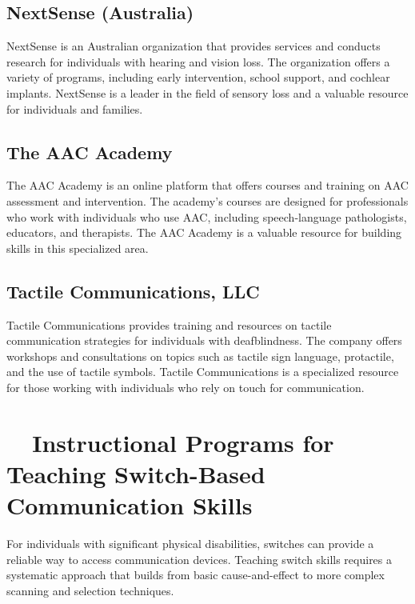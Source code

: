\subsection{NextSense (Australia)}\label{app6:nextsense}
NextSense is an Australian organization that provides services and conducts research for individuals with hearing and vision loss. The organization offers a variety of programs, including early intervention, school support, and cochlear implants. NextSense is a leader in the field of sensory loss and a valuable resource for individuals and families.

\subsection{The AAC Academy}\label{app6:aac-academy}
The AAC Academy is an online platform that offers courses and training on AAC assessment and intervention. The academy's courses are designed for professionals who work with individuals who use AAC, including speech-language pathologists, educators, and therapists. The AAC Academy is a valuable resource for building skills in this specialized area.

\subsection{Tactile Communications, LLC}\label{app6:tactile-comm}
Tactile Communications provides training and resources on tactile communication strategies for individuals with deafblindness. The company offers workshops and consultations on topics such as tactile sign language, protactile, and the use of tactile symbols. Tactile Communications is a specialized resource for those working with individuals who rely on touch for communication.

\section{~~Instructional Programs for Teaching Switch-Based Communication Skills}\label{app6:switch-comm}
For individuals with significant physical disabilities, switches can provide a reliable way to access communication devices. Teaching switch skills requires a systematic approach that builds from basic cause-and-effect to more complex scanning and selection techniques.

